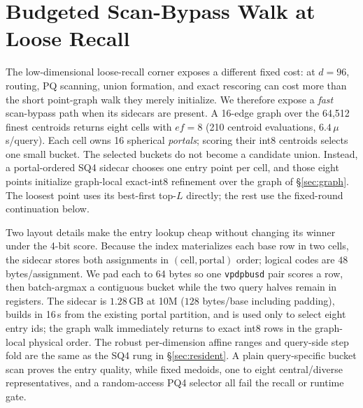 \documentclass{article}
\begin{document}
\section{Budgeted Scan-Bypass Walk at Loose Recall}
\label{sec:adaptivewalk}
The low-dimensional loose-recall corner exposes a different fixed cost: at
$d{=}96$, routing, PQ scanning, union formation, and exact rescoring can cost more
than the short point-graph walk they merely initialize. We therefore expose a
\emph{fast} scan-bypass path when its sidecars are present. A
16-edge graph over the 64,512 finest centroids returns eight cells with
$ef{=}8$ (210 centroid evaluations, $6.4\,\mu$s/query). Each cell owns 16
spherical \emph{portals}; scoring their int8 centroids selects one small bucket.
The selected buckets do not become a candidate union. Instead, a portal-ordered
SQ4 sidecar chooses one entry point per cell, and those eight points initialize
graph-local exact-int8 refinement over the graph of \S\ref{sec:graph}. The
loosest point uses its best-first top-$L$ directly; the rest use the fixed-round
continuation below.

Two layout details make the entry lookup cheap without changing its winner under
the 4-bit score. Because the index materializes each base row in two cells, the
sidecar stores both assignments in $(\text{cell},\text{portal})$ order; logical
codes are $48$ bytes/assignment. We pad each to 64 bytes so one
\texttt{vpdpbusd} pair scores a row, then batch-argmax a contiguous bucket while
the two query halves remain in registers. The sidecar is $1.28$\,GB at 10M
($128$ bytes/base including padding), builds in 16\,s from the existing portal
partition, and is used only to select eight entry ids; the graph walk immediately
returns to exact int8 rows in the graph-local physical order. The robust
per-dimension affine ranges and query-side step fold are the same as the SQ4 rung
in \S\ref{sec:resident}. A plain query-specific bucket scan proves the entry
quality, while fixed medoids, one to eight central/diverse representatives, and a
random-access PQ4 selector all fail the recall or runtime gate.
\end{document}
